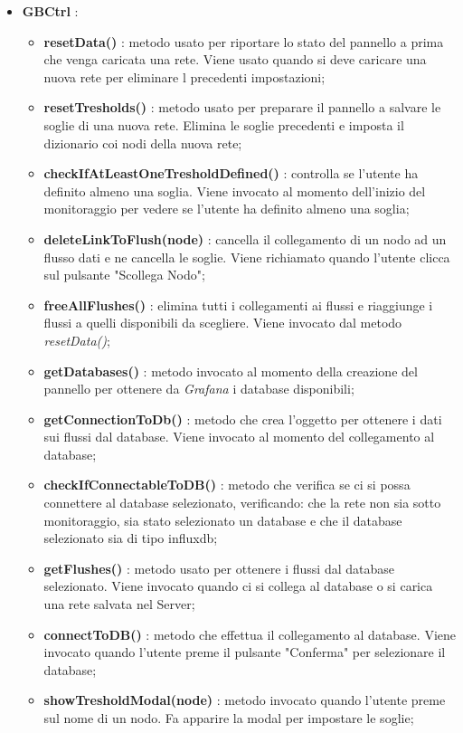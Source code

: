 \begin{itemize}
	\item \textbf{GBCtrl} :
		\begin{itemize}
			\item \textbf{resetData()} : metodo usato per riportare lo stato del pannello a prima che venga caricata una rete. Viene usato quando si deve caricare una nuova rete per eliminare l precedenti impostazioni;
			\item \textbf{resetTresholds()} : metodo usato per preparare il pannello a salvare le soglie di una nuova rete. Elimina le soglie precedenti e imposta il dizionario coi nodi della nuova rete;
			\item \textbf{checkIfAtLeastOneTresholdDefined()} : controlla se l'utente ha definito almeno una soglia. Viene invocato al momento dell'inizio del monitoraggio per vedere se l'utente ha definito almeno una soglia;
			\item \textbf{deleteLinkToFlush(node)} : cancella il collegamento di un nodo ad un flusso dati e ne cancella le soglie. Viene richiamato quando l'utente clicca sul pulsante "Scollega Nodo";
			\item \textbf{freeAllFlushes()} : elimina tutti i collegamenti ai flussi e riaggiunge i flussi a quelli disponibili da scegliere. Viene invocato dal metodo \textit{resetData()};
			\item \textbf{getDatabases()} : metodo invocato al momento della creazione del pannello per ottenere da \textit{Grafana} i database disponibili;
			\item \textbf{getConnectionToDb()} : metodo che crea l'oggetto per ottenere i dati sui flussi dal database. Viene invocato al momento del collegamento al database;
			\item \textbf{checkIfConnectableToDB()} : metodo che verifica se ci si possa connettere al database selezionato, verificando: che la rete non sia sotto monitoraggio, sia stato selezionato un database e che il database selezionato sia di tipo influxdb;
			\item \textbf{getFlushes()} : metodo usato per ottenere i flussi dal database selezionato. Viene invocato quando ci si collega al database  o si carica una rete salvata nel Server;
			\item \textbf{connectToDB()} : metodo che effettua il collegamento al database. Viene invocato quando l'utente preme il pulsante "Conferma" per selezionare il database;
			\item \textbf{showTresholdModal(node)} : metodo invocato quando l'utente preme sul nome di un nodo. Fa apparire la modal per impostare le soglie;

\end{itemize}
\end{itemize}
